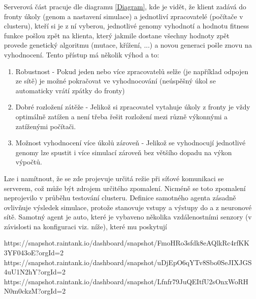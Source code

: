 Serverová část pracuje dle diagramu \ref{Diagram}, kde je vidět, že klient zadává do fronty úkoly (genom a nastavení simulace) a jednotliví zpracovatelé (počítače v clusteru), kteří si je z ní vyberou, jednotlivé genomy vyhodnotí a hodnotu fitness funkce pošlou zpět na klienta, který jakmile dostane všechny hodnoty zpět provede genetický algoritmu (mutace, křížení, ...) a novou generaci pošle znovu na vyhodnocení.
Tento přístup má několik výhod a to:
\begin{enumerate}
	\item Robustnost - Pokud jeden nebo více zpracovatelů selže (je například odpojen ze sítě) je možné pokračovat ve vyhodnocování (neúspěšný úkol se automaticky vrátí zpátky do fronty)
	\item Dobré rozložení zátěže - Jelikož si zpracovatel vytahuje úkoly z fronty je vždy optimálně zatížen a není třeba řešit rozložení mezi různě výkonnými a zatíženými počítači.
	\item Možnost vyhodnocení více úkolů zároveň - Jelikož se vyhodnocují jednotlivé genomy lze spustit i více simulací zároveň bez většího dopadu na výkon výpočtů.
\end{enumerate}

Lze i namítnout, že se zde projevuje určitá režie při síťové komunikaci se serverem, což může být zdrojem určitého zpomalení. Nicméně se toto zpomalení neprojevilo v průběhu testování clusteru. 
Definice samotného agenta zásadně ovlivňuje výsledek simulace, protože stanovuje vstupy a výstupy do a z neuronové sítě. 
Samotný agent je auto, které je vybaveno několika vzdálenostními senzory (v závislosti na konfiguraci viz. níže), které mu poskytují 

https://snapshot.raintank.io/dashboard/snapshot/FmoHRo3sfdk8eAQlkRc4rfKK3YF043oE?orgId=2
https://snapshot.raintank.io/dashboard/snapshot/uDjEpO6qYTv8Sbo0SeJIXJGS4uU1N2hY?orgId=2
https://snapshot.raintank.io/dashboard/snapshot/Lfnfr79JuQEItfU2sOnxWoRHN0m0ckzM?orgId=2
